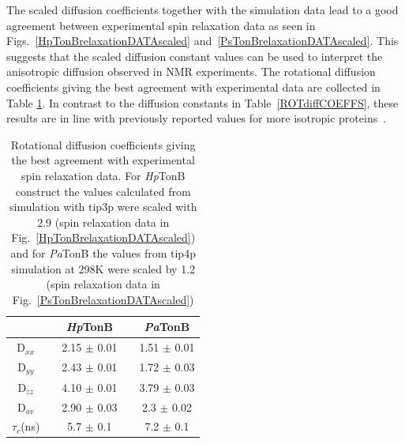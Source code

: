 \documentclass[pre,aps,floatfix,authordate1-4,twocolumn]{revtex4-1}
\begin{document}
The scaled diffusion coefficients together with the simulation data
lead to a good agreement between experimental spin relaxation data as seen
in Figs.~\ref{HpTonBrelaxationDATAscaled} and~\ref{PsTonBrelaxationDATAscaled}.
This suggests that the scaled diffusion constant values can be used to interpret
the anisotropic diffusion observed in NMR experiments.
The rotational diffusion coefficients giving the best agreement with experimental 
data are collected in Table \ref{ROTdiffCOEFFSscaled}.
In contrast to the diffusion constants in Table~\ref{ROTdiffCOEFFS},
these results are in line with previously reported values for more isotropic
proteins~\cite{krishnan98}.
\begin{table}[!h]
  \centering
  \caption{Rotational diffusion coefficients giving the best agreement with experimental spin relaxation data.
    For {\it Hp}TonB construct the values calculated from simulation with tip3p were scaled with 2.9
    (spin relaxation data in Fig.~\ref{HpTonBrelaxationDATAscaled}) and  for {\it Pa}TonB
    the values from tip4p simulation at 298K were scaled by 1.2 (spin relaxation data in
    Fig.~\ref{PsTonBrelaxationDATAscaled})}\label{ROTdiffCOEFFSscaled}
  \begin{tabular}{c c c c c}
    &    &  {\it Hp}TonB  &  & {\it Pa}TonB \\
    \hline
    D$_{xx}$    &   &   2.15 $\pm$ 0.01  & & 1.51  $\pm$ 0.01\\
    D$_{yy}$   &    &  2.43  $\pm$ 0.01  & & 1.72  $\pm$ 0.03\\
    D$_{zz}$   &    &  4.10   $\pm$ 0.01 & & 3.79  $\pm$ 0.03\\
    D$_{av}$  &    &   2.90  $\pm$ 0.03  & & 2.3  $\pm$ 0.02\\
    $\tau_{c}$(ns)  &    &  5.7   $\pm$ 0.1  & & 7.2 $\pm$ 0.1 \\
\end{tabular}
\end{table} 
\end{document}
